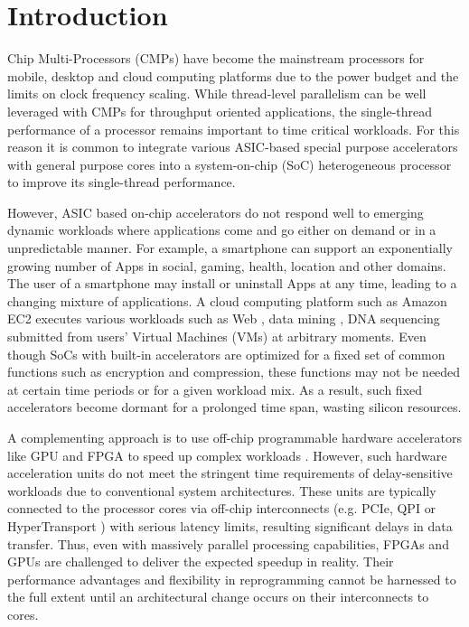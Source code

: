 
\section{Introduction}


Chip Multi-Processors (CMPs) have become the mainstream processors for
mobile, desktop and cloud computing platforms due to the power
budget and the limits on clock frequency scaling. While
thread-level parallelism can be well leveraged with CMPs \cite{CMP05}
for throughput oriented applications, the single-thread performance of
a processor remains important to time critical workloads. For this
reason it is common to integrate various ASIC-based special 
purpose accelerators with general purpose cores into
a system-on-chip (SoC) heterogeneous processor
\cite{soc-acc} to improve its single-thread performance. 

However, ASIC based on-chip accelerators do not respond well to
emerging dynamic workloads where applications come and go either on
demand or in a unpredictable manner. For example, a smartphone can
support an exponentially growing number of Apps in social, gaming,
health, location and other domains. The user of a smartphone may
install or uninstall Apps at any time, leading to a changing mixture
of applications. A cloud computing platform such as Amazon EC2
\cite{amazon-ec2} executes various workloads such as Web
\cite{Chen:2012jo}, data mining \cite{ec2-datamining}, DNA sequencing
\cite{ec2-dna} submitted from users' Virtual Machines (VMs) at
arbitrary moments. Even though SoCs with built-in accelerators are
optimized for a fixed set of common functions such as encryption and
compression, these functions may not be needed at certain time periods
or for a given workload mix. As a result, such fixed accelerators
become dormant for a prolonged time span, wasting silicon resources.

A complementing approach is to use off-chip programmable hardware
accelerators like GPU and FPGA to speed up complex workloads
\cite{GPUFPGA, fpga-acc}. However, such hardware acceleration units do
not meet the stringent time requirements of delay-sensitive workloads
due to conventional system architectures. These units are typically
connected to the processor cores via off-chip interconnects
(e.g. PCIe, QPI \cite{intel-qpi} or HyperTransport
\cite{amd-hypertransport}) with serious latency limits, resulting
significant delays in data transfer. Thus, even with massively
parallel processing capabilities, FPGAs and GPUs are challenged to
deliver the expected speedup in reality. Their performance advantages
and flexibility in reprogramming cannot be harnessed to the full
extent until an architectural change occurs on their interconnects to
cores.

